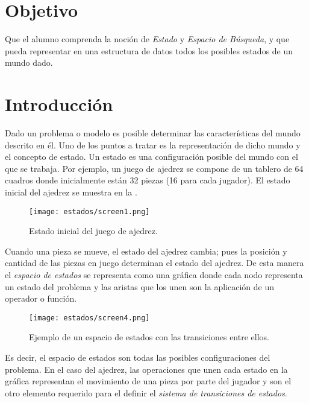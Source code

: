 

\section{Objetivo}
Que el alumno comprenda la noción de \emph{Estado} y \emph{Espacio de Búsqueda}, y que pueda representar en una estructura de datos todos los posibles estados de un mundo dado. \par

\section{Introducci\'on}
Dado un problema o modelo es posible determinar las características del mundo descrito en él. Uno de los puntos a tratar es la representación de dicho mundo y el concepto de estado. Un estado es una configuración posible del mundo con el que se trabaja. Por ejemplo, un juego de ajedrez se compone de un tablero de 64 cuadros donde inicialmente están 32 piezas (16 para cada jugador). El estado inicial del ajedrez se muestra en la .\par

\begin{figure}
  \centering
  \texttt{[image: estados/screen1.png]}
  \caption{Estado inicial del juego de ajedrez.}
  \label{fig:ajedrez}
\end{figure}

Cuando una pieza se mueve, el estado del ajedrez cambia; pues la posición y cantidad de las piezas en juego determinan el estado del ajedrez.  De esta manera el \emph{espacio de estados} se representa como una gráfica donde cada nodo representa un estado del problema y las aristas que los unen son la aplicación de un operador o función.\par


\begin{figure}
  \centering
  \texttt{[image: estados/screen4.png]}
  \caption{Ejemplo de un espacio de estados con las transiciones entre ellos. \protect\footnotemark }
  \label{fig:espacioestados}
\end{figure}


Es decir, el espacio de estados son todas las posibles configuraciones del problema. En el caso del ajedrez, las operaciones que unen cada estado en la gráfica representan el movimiento de una pieza por parte del jugador y son el otro elemento requerido para el definir el \emph{sistema de transiciones de estados}.\par


